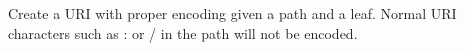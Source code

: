 Create a URI with proper encoding given a path and a leaf. Normal URI characters such as : or / in the path will not be encoded.
